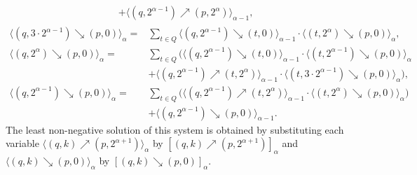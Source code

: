 \documentclass[a4paper,UKenglish,cleveref,autoref,thm-restate,colorlinks]{lipics-v2021}
\newcommand{\ocStateSpace}{Q}
\newcommand{\ocState}{q}
\newcommand{\ocStateB}{p}
\newcommand{\ocStateC}{t}
\newcommand{\ocCount}{k}
\newcommand{\powerIndex}{\alpha}
\newcommand{\upProba}[5]{[(#1,#2)\nearrow{}(#3,#4)]_{#5}}
\newcommand{\downProba}[5]{[(#1,#2)\searrow{}(#3,#4)]_{#5}}
\newcommand{\upProbaVar}[5]{\langle (#1,#2)\nearrow{}(#3,#4)\rangle_{#5}}
\newcommand{\downProbaVar}[5]{\langle (#1,#2)\searrow{}(#3,#4)\rangle_{#5}}
\begin{document}
\begin{theorem}
\begin{align}
\begin{split}
      &
      + \upProbaVar{\ocState}{2^{\powerIndex-1}}{\ocStateB}{2^{\powerIndex}}{\powerIndex-1},
    \end{split}\label{equation:transitions:up:third}
  \end{align}
  \begin{align*}
    \downProbaVar{\ocState}{3\cdot 2^{\powerIndex-1}}{\ocStateB}{0}{\powerIndex} =
    & 
      \sum_{\ocStateC\in\ocStateSpace}
      \downProbaVar{\ocState}{2^{\powerIndex-1}}{\ocStateC}{0}{\powerIndex-1}
      \cdot
      \downProbaVar{\ocStateC}{2^{\powerIndex}}{\ocStateB}{0}{\powerIndex}, \\
    \downProbaVar{\ocState}{2^{\powerIndex}}{\ocStateB}{0}{\powerIndex} =
    &
      \sum_{\ocStateC\in\ocStateSpace}\bigg(
      \downProbaVar{\ocState}{2^{\powerIndex-1}}{\ocStateC}{0}{\powerIndex-1}
      \cdot 
      \downProbaVar{\ocStateC}{2^{\powerIndex-1}}{\ocStateB}{0}{\powerIndex} \\
    &
      +
      \upProbaVar{\ocState}{2^{\powerIndex-1}}{\ocStateC}{2^{\powerIndex}}{\powerIndex-1}
      \cdot 
      \downProbaVar{\ocStateC}{3\cdot 2^{\powerIndex-1}}{\ocStateB}{0}{\powerIndex}
      \bigg), \\
    \downProbaVar{\ocState}{2^{\powerIndex-1}}{\ocStateB}{0}{\powerIndex} =
    &
      \sum_{\ocStateC\in\ocStateSpace}\bigg(
      \upProbaVar{\ocState}{2^{\powerIndex-1}}{\ocStateC}{2^{\powerIndex}}{\powerIndex-1}
      \cdot
      \downProbaVar{\ocStateC}{2^{\powerIndex}}{\ocStateB}{0}{\powerIndex}
      \bigg) \\
    &
      + \downProbaVar{\ocState}{2^{\powerIndex-1}}{\ocStateB}{0}{\powerIndex-1}.
  \end{align*}
  The least non-negative solution of this system is obtained by substituting each variable $\upProbaVar{\ocState}{\ocCount}{\ocStateB}{2^{\powerIndex+1}}{\powerIndex}$ by $\upProba{\ocState}{\ocCount}{\ocStateB}{2^{\powerIndex+1}}{\powerIndex}$ and $\downProbaVar{\ocState}{\ocCount}{\ocStateB}{0}{\powerIndex}$ by $\downProba{\ocState}{\ocCount}{\ocStateB}{0}{\powerIndex}$.
\end{theorem}
\end{document}
